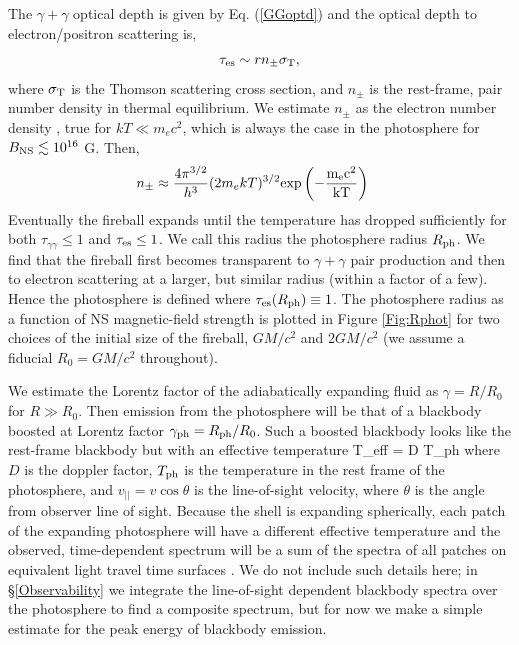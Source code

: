 The $\gamma + \gamma$ optical depth is given by Eq. (\ref{GGoptd}) and
the optical depth to electron/positron scattering is,
\begin{equation}
\tau_{\rm{es}} \sim r n_{\pm} \sigma_{\rm{T}}, 
\end{equation}
where $\sigma_{\rm{T}}$ is the Thomson scattering cross section, and
$n_{\pm}$ is the rest-frame, pair number density in thermal
equilibrium. We estimate $n_{\pm}$ as the electron number density
\citep[{\em e.g.},][]{Pacz:1986GRB}, true for $kT \ll m_e c^2$, which
is always the case in the photosphere for $B_{\rm{NS}} \lesssim 10^{16}$
G. Then,
\begin{align}
\label{Eq:npm}
n_{\pm} &\approx \frac{4 \pi^{3/2}}{h^3} (2 m_e k T)^{3/2} \rm{exp}\left(- \frac{m_e c^2}{k T}\right) 
\end{align}
Eventually the fireball expands until the temperature has dropped
sufficiently for both $\tau_{\gamma \gamma} \leq 1$ and $\tau_{\rm es}
\leq1$. We call this radius the photosphere radius $R_{\rm{ph}}$. We
find that the fireball first becomes transparent to $\gamma + \gamma$
pair production and then to electron scattering at a larger, but
similar radius (within a factor of a few). Hence the photosphere is
defined where $\tau_{\rm es}(R_{\rm{ph}}) \equiv 1$. The photosphere
radius as a function of NS magnetic-field strength is plotted in
Figure \ref{Fig:Rphot} for two choices of the initial size of the
fireball, $GM/c^2$ and $2GM/c^2$ (we assume a fiducial $R_0=GM/c^2$
throughout).






We estimate the Lorentz factor of the adiabatically expanding fluid as
$\gamma = R/R_0$ \citep{Pacz:1986GRB} for $R\gg R_0$.  Then emission
from the photosphere will be that of a blackbody boosted at Lorentz
factor $\gamma_{\rm{ph}} = R_{\rm{ph}}/R_0$. Such a boosted blackbody
looks like the rest-frame blackbody but with an effective temperature
\be 
T_{\rm eff} =  \equiv D T_{\rm{ph}}
\label{Eq:Teff}
\ee where $D$ is the doppler factor, $T_{\rm{ph}}$ is the temperature
in the rest frame of the photosphere, and $v_{||} = v\cos{\theta}$ is
the line-of-sight velocity, where $\theta$ is the angle from observer
line of sight. Because the shell is expanding spherically, each patch
of the expanding photosphere will have a different effective
temperature and the observed, time-dependent spectrum will be a sum of
the spectra of all patches on equivalent light travel time surfaces
\citep[{\em e.g.},][]{Pe'er:2011}. We do not include such details
here; in \S \ref{Observability} we integrate the line-of-sight
dependent blackbody spectra over the photosphere to find a composite
spectrum, but for now we make a simple estimate for the peak energy of
blackbody emission.

